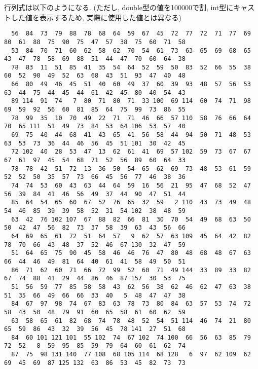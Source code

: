 \documentclass[a4j]{jarticle}
\begin{document}
行列式は以下のようになる. (ただし, double型の値を100000で割, int型にキャストした値を表示するため, 実際に使用した値とは異なる)
{\baselineskip 2mm
  \scriptsize
\begin{verbatim}
  56  84  73  79  88  78  68  64  59  67  45  72  77  72  71  77  69  80  61  88  75  90  75  47  57  38  75  60  71  58
  53  84  70  71  60  62  58  62  70  54  61  73  63  65  69  68  65  43  47  78  58  69  88  51  44  47  70  60  64  38
  78  83  11  51  85  41  35  54  64  52  59  50  83  52  66  55  38  60  52  90  49  52  63  68  43  51  93  47  40  48
  66  80  49  46  45  51  40  60  49  37  60  39  93  48  57  56  53  63  44  75  44  45  44  61  42  45  80  40  54  43
  89 114  91  74   7  80  71  80  71  33 100  69 114  60  74  71  98  69  59  92  56  60  81  85  64  75  99  73  86  55
  78  99  35  10  70  49  22  71  71  46  66  57 110  58  76  66  64  70  65 111  51  49  73  84  53  64 106  53  57  40
  69  75  40  44  68  41  43  65  41  56  58  44  94  50  71  48  53  63  53  73  36  44  46  56  45  51 101  30  42  45
  72 102  40  28  53  47  13  62  61  41  69  57 102  59  73  67  67  67  61  97  45  54  68  71  52  56  89  60  64  33
  78  78  42  51  72  13  36  50  54  65  62  69  73  48  53  61  59  52  52  50  35  57  73  66  45  56  77  46  38  36
  74  74  53  60  43  63  44  64  59  16  56  21  95  47  68  52  47  56  39  84  41  46  56  49  37  44  90  47  51  44
  85  64  54  65  60  67  52  76  65  32  59   2 110  43  73  49  48  54  46  85  39  39  58  52  31  54 102  38  48  59
  63  42  76 102 107  67  88  82  66  81  30  70  54  49  68  63  50  50  42  47  56  82  73  37  58  39  63  43  56  66
  64  69  65  61  72  51  64  57   9  62  57  63 109  45  64  42  82  78  70  66  43  48  37  52  46  67 130  32  47  59
  51  64  65  75  90  45  58  46  46  76  47  80  48  68  48  67  63  66  44  46  49  81  64  40  61  41  58  49  50  51
  86  71  62  60  71  66  72  99  52  60  71  49 144  33  89  33  82  67  74  88  41  29  44  86  46  87 157  30  53  75
  51  56  59  77  85  58  58  43  62  56  38  62  46  62  47  63  38  51  35  66  49  66  66  33  40   5  48  47  47  38
  84  67  97  98  74  67  83  63  78  73  80  84  63  57  53  74  72  58  43  50  48  79  91  60  65  58  61  60  62  59
  63  58  65  61  82  68  74  78  48  52  54  51 114  46  74  21  80  65  59  86  43  32  39  56  45  78 141  27  51  68
  84  60 101 121 101  55 102  74  67 102  74 100  66  56  63  85  79  72  52   8  59  95  85  59  79  64  60  61  62  74
  87  75  98 131 140  77 108  68 105 114  68 128   6  97  62 109  62  69  45  69  87 125 132  63  86  53  45  82  73  73

\end{verbatim}}
\end{document}
